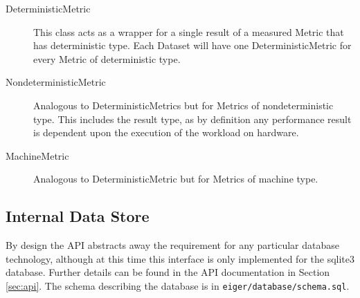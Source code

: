 \begin{description}
\item[DeterministicMetric] This class acts as a wrapper for a single result of a
measured Metric that has deterministic type. Each Dataset will have one
DeterministicMetric for every Metric of deterministic type.

\item[NondeterministicMetric] Analogous to DeterministicMetrics but for Metrics
of nondeterministic type. This includes the result type, as by definition
any performance result is dependent upon the execution of the workload on
hardware.

\item[MachineMetric] Analogous to DeterministicMetric but for Metrics of machine
type. 
\end{description}

\subsection{Internal Data Store}
By design the API abstracts away the requirement for any particular database
technology, although at this time this interface is only implemented for the
sqlite3 database. Further details can be found in the API documentation in
Section \ref{sec:api}. The schema describing the database is in
\texttt{eiger/database/schema.sql}. 

